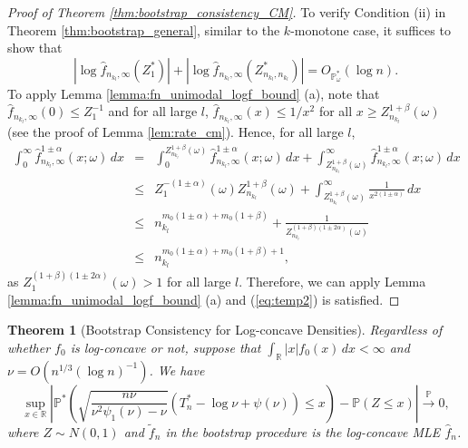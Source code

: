 \documentclass[12pt,letterpaper, twoside, openany]{article}
\theoremstyle{plain}
\newtheorem{theorem}{Theorem}[section]
\begin{document}
\begin{proof}[Proof of Theorem \ref{thm:bootstrap_consistency_CM}]
To verify Condition (ii) in Theorem \ref{thm:bootstrap_general}, similar to the $k$-monotone case, it suffices to show that 
\begin{equation}\label{eq:temp2}
	|\log \hat{f}_{n_{k_l},\infty}(Z^*_1)| + |\log \hat{f}_{n_{k_l},\infty}(Z^*_{n_{k_l},n_{k_l}})| = O_{ \mathbb{P}^*_\omega}(\log n).
\end{equation}
To apply Lemma \ref{lemma:fn_unimodal_logf_bound} (a), note that $\hat{f}_{n_{k_l},\infty}(0) \leq Z^{-1}_1$ and for all large $l$, $\hat{f}_{n_{k_l}, \infty}(x) \leq 1/x^2$ for all $x \geq Z^{1+\beta}_{n_{k_l}}(\omega)$ (see the proof of Lemma \ref{lem:rate_cm}). Hence, for all large $l$,
\begin{eqnarray*}
	\int^\infty_0 \hat{f}^{1\pm \alpha}_{n_{k_l}, \infty}(x;\omega)\, dx &=&  \int^{Z^{1+\beta}_{n_{k_l}}(\omega)}_0 \hat{f}^{1\pm\alpha}_{n_{k_l}, \infty}(x;\omega)\, dx + \int^\infty_{Z_{n_{k_l}}^{1+\beta}(\omega)} \hat{f}^{1\pm\alpha}_{n_{k_l}, \infty}(x;\omega)\, dx  \\
	&	\leq & Z^{-(1\pm\alpha)}_1(\omega) Z^{1+\beta}_{n_{k_l}}(\omega) + \int^\infty_{Z^{1+\beta}_{n_{k_l}}(\omega)} \frac{1}{x^{2(1\pm \alpha)} } \, dx \\
	& \leq &  n_{k_l}^{m_0(1\pm \alpha) + m_0(1+\beta)} + \frac{1}{Z^{(1+\beta)(1\pm 2\alpha) }_{n_{k_l}}(\omega)} \\
	& \leq & n_{k_l}^{m_0(1  \pm \alpha) + m_0(1+\beta) + 1},
\end{eqnarray*}
as $Z^{(1+\beta)(1\pm 2\alpha)}_1(\omega) > 1$ for all large $l$. Therefore, we can apply Lemma \ref{lemma:fn_unimodal_logf_bound} (a) and (\ref{eq:temp2}) is satisfied.
%
%
\end{proof}


\begin{theorem}[Bootstrap Consistency for Log-concave Densities]\label{thm:bootstrap_consistency_LC}
Regardless of whether $f_0$ is log-concave or not, suppose that $\int_{\mathbb{R}} |x| f_0(x) \, dx< \infty$ and $\nu = O(n^{1/3}(\log n)^{-1})$. We have
\begin{equation*}
	\sup_{x \in \mathbb{R}} \left| \mathbb{P}^* \left( \sqrt{ \frac{n\nu}{\nu^2\psi_1(\nu)-\nu}} \left( T_n^* -  \log \nu +  \psi(\nu) \right)  \leq x\right) - \mathbb{P}(Z \leq x ) \right| \stackrel{\mathbb{P}}{\rightarrow} 0,
\end{equation*}
where $Z \sim N(0, 1)$ and  $\tilde{f}_n$ in the bootstrap procedure is the log-concave MLE $\hat{f}_n$.
\end{theorem}
\end{document}
